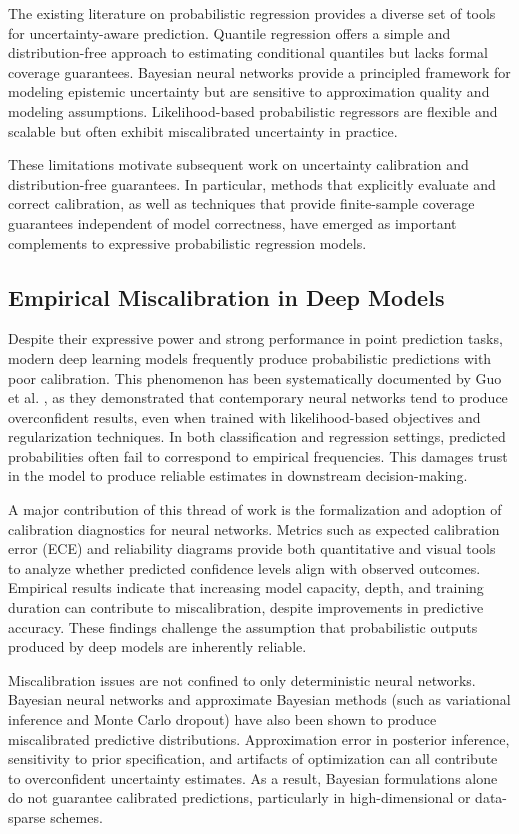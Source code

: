 The existing literature on probabilistic regression provides a diverse set of tools for uncertainty-aware prediction. Quantile regression offers a simple and distribution-free approach to estimating conditional quantiles but lacks formal coverage guarantees. Bayesian neural networks provide a principled framework for modeling epistemic uncertainty but are sensitive to approximation quality and modeling assumptions. Likelihood-based probabilistic regressors are flexible and scalable but often exhibit miscalibrated uncertainty in practice.

These limitations motivate subsequent work on uncertainty calibration and distribution-free guarantees. In particular, methods that explicitly evaluate and correct calibration, as well as techniques that provide finite-sample coverage guarantees independent of model correctness, have emerged as important complements to expressive probabilistic regression models.

\subsection{Empirical Miscalibration in Deep Models}

Despite their expressive power and strong performance in point prediction tasks, modern deep learning models frequently produce probabilistic predictions with poor calibration. This phenomenon has been systematically documented by Guo et al. \cite{guo2017calibration}, as they demonstrated that contemporary neural networks tend to produce overconfident results, even when trained with likelihood-based objectives and regularization techniques. In both classification and regression settings, predicted probabilities often fail to correspond to empirical frequencies. This damages trust in the model to produce reliable estimates in downstream decision-making.

A major contribution of this thread of work is the formalization and adoption of calibration diagnostics for neural networks. Metrics such as expected calibration error (ECE) and reliability diagrams provide both quantitative and visual tools to analyze whether predicted confidence levels align with observed outcomes. Empirical results indicate that increasing model capacity, depth, and training duration can contribute to miscalibration, despite improvements in predictive accuracy. These findings challenge the assumption that probabilistic outputs produced by deep models are inherently reliable.

Miscalibration issues are not confined to only deterministic neural networks. Bayesian neural networks and approximate Bayesian methods (such as variational inference and Monte Carlo dropout) have also been shown to produce miscalibrated predictive distributions. Approximation error in posterior inference, sensitivity to prior specification, and artifacts of optimization can all contribute to overconfident uncertainty estimates. As a result, Bayesian formulations alone do not guarantee calibrated predictions, particularly in high-dimensional or data-sparse schemes.

